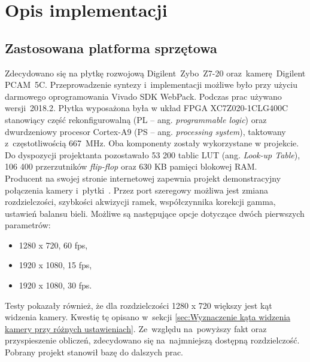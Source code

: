 \chapter{Opis implementacji}
\label{cha:Opis implementacji}
\section{Zastosowana platforma sprzętowa}
\label{sec:Zastosowana platforma sprzętowa}
Zdecydowano się na płytkę rozwojową Digilent~Zybo~Z7-20 oraz~kamerę~Digilent PCAM~5C. Przeprowadzenie syntezy i~implementacji możliwe było przy użyciu darmowego oprogramowania Vivado SDK WebPack. Podczas prac używano wersji~2018.2. Płytka wyposażona była w układ FPGA XC7Z020-1CLG400C stanowiący część rekonfigurowalną (PL -- ang. \textit{programmable logic}) oraz dwurdzeniowy procesor Cortex-A9 (PS -- ang. \textit{processing system}), taktowany z~częstotliwością 667~MHz. Oba komponenty zostały wykorzystane w projekcie. Do dyspozycji projektanta pozostawało 53 200 tablic LUT (ang. \textit{Look-up Table}), 106 400 przerzutników \textit{flip-flop} oraz 630 KB pamięci blokowej RAM. \\
Producent na swojej stronie internetowej zapewnia projekt demonstracyjny połączenia kamery i~płytki~\cite{projektPCAM}. Przez port szeregowy możliwa jest zmiana rozdzielczości, szybkości akwizycji ramek, współczynnika korekcji gamma, ustawień balansu bieli. Możliwe są następujące opcje dotyczące dwóch pierwszych parametrów:
\begin{itemize}
	\item 1280 x 720, 60 fps,
	\item 1920 x 1080, 15 fps,
	\item 1920 x 1080, 30 fps.
\end{itemize}
Testy pokazały również, że dla rozdzielczości 1280 x 720 większy jest kąt widzenia kamery. Kwestię tę opisano w~sekcji \ref{sec:Wyznaczenie kąta widzenia kamery przy różnych ustawieniach}. Ze~względu na~powyższy fakt oraz przyspieszenie obliczeń, zdecydowano się na~najmniejszą dostępną rozdzielczość.\\
Pobrany projekt stanowił bazę do dalszych prac. 
